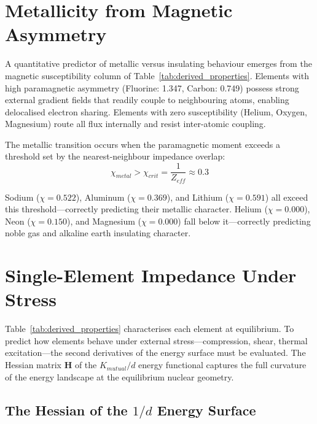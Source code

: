 \section{Metallicity from Magnetic Asymmetry}

A quantitative predictor of metallic versus insulating behaviour emerges from the magnetic susceptibility column of Table~\ref{tab:derived_properties}. Elements with high paramagnetic asymmetry (Fluorine: 1.347, Carbon: 0.749) possess strong external gradient fields that readily couple to neighbouring atoms, enabling delocalised electron sharing. Elements with zero susceptibility (Helium, Oxygen, Magnesium) route all flux internally and resist inter-atomic coupling.

The metallic transition occurs when the paramagnetic moment exceeds a threshold set by the nearest-neighbour impedance overlap:
\begin{equation}
    \chi_{metal} > \chi_{crit} = \frac{1}{Z_{eff}} \approx 0.3
\end{equation}

Sodium ($\chi = 0.522$), Aluminum ($\chi = 0.369$), and Lithium ($\chi = 0.591$) all exceed this threshold---correctly predicting their metallic character. Helium ($\chi = 0.000$), Neon ($\chi = 0.150$), and Magnesium ($\chi = 0.000$) fall below it---correctly predicting noble gas and alkaline earth insulating character.

\section{Single-Element Impedance Under Stress}
\label{sec:element_impedance}

Table~\ref{tab:derived_properties} characterises each element at equilibrium. To predict how elements behave under external stress---compression, shear, thermal excitation---the second derivatives of the energy surface must be evaluated. The Hessian matrix $\mathbf{H}$ of the $K_{mutual}/d$ energy functional captures the full curvature of the energy landscape at the equilibrium nuclear geometry.

\subsection{The Hessian of the $1/d$ Energy Surface}

